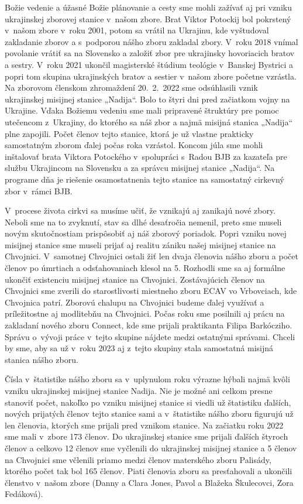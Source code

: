 Božie vedenie a úžasné Božie plánovanie a cesty sme mohli zažívať aj pri vzniku ukrajinskej zborovej stanice v~našom zbore. Brat Viktor Potockij bol pokrstený v~našom zbore v~roku 2001, potom sa vrátil na Ukrajinu, kde vyštudoval zakladanie zborov a s~podporou nášho zboru zakladal zbory. V~roku 2018 vnímal povolanie vrátiť sa na Slovensko a založiť zbor pre ukrajinsky hovoriacich bratov a sestry. V~roku 2021 ukončil magisterské štúdium teológie v~Banskej Bystrici a popri tom skupina ukrajinských bratov a sestier v~našom zbore početne vzrástla. Na zborovom členskom zhromaždení 20.~2.~2022 sme odsúhlasili vznik ukrajinskej misijnej stanice „Nadija“. Bolo to štyri dni pred začiatkom vojny na Ukrajine. Vďaka Božiemu vedeniu sme mali pripravené štruktúry pre pomoc utečencom z~Ukrajiny, do ktorého sa náš zbor a najmä misijná stanica „Nadija“ plne zapojili. Počet členov tejto stanice, ktorá je už vlastne prakticky samostatným zborom ďalej počas roka vzrástol. Koncom júla sme mohli inštalovať brata Viktora Potockého v~spolupráci s~Radou BJB za kazateľa pre službu Ukrajincom na Slovensku a za správcu misijnej stanice „Nadija“. Na programe dňa je riešenie osamostatnenia tejto stanice na samostatný cirkevný zbor v~rámci BJB.

V~procese života cirkvi sa musíme učiť, že vznikajú aj zanikajú nové zbory. Neboli sme na to zvyknutí, stav sa dlhé desaťročia nemenil, preto sme museli novým skutočnostiam prispôsobiť aj náš zborový poriadok. Popri vzniku novej misijnej stanice sme museli prijať aj realitu zániku našej misijnej stanice na Chvojnici. V~samotnej Chvojnici ostali žiť len dvaja členovia nášho zboru a počet členov po úmrtiach a odsťahovaniach klesol na 5. Rozhodli sme sa aj formálne ukončiť existenciu misijnej stanice na Chvojnici. Zostávajúcich členov na Chvojnici sme zverili do starostlivosti miestneho zboru ECAV vo Vrbovciach, kde Chvojnica patrí. Zborovú chalupu na Chvojnici budeme ďalej využívať a príležitostne aj modlitebňu na Chvojnici.
Počas roku sme posilnili aj prácu na zakladaní nového zboru Connect, kde sme prijali praktikanta Filipa Barkócziho. Správu o~vývoji práce v~tejto skupine nájdete medzi ostatnými správami. Chceli by sme, aby sa už v~roku 2023 aj z~tejto skupiny stala samostatná misijná stanica nášho zboru.


Čísla v~štatistike nášho zboru sa v~uplynulom roku výrazne hýbali najmä kvôli vzniku ukrajinskej misijnej stanice Nadija. Nie je možné ani celkom presne stanoviť počet, nakoľko po vzniku misijnej stanice si viedli už štatistiku ďalších, nových prijatých členov tejto stanice sami a v~štatistike nášho zboru figurujú už len členovia, ktorých sme prijali pred vznikom stanice.
Na začiatku roku 2022 sme mali v~zbore 173 členov. Do ukrajinskej stanice sme prijali ďalších štyroch členov a celkovo 12 členov sme vyčlenili do ukrajinskej misijnej stanice a 5 členov na Chvojnici sme včlenili priamo medzi členov materského zboru Palisády, ktorého počet tak bol 165 členov. Piati členovia zboru sa presťahovali a ukončili členstvo v~našom zbore (Danny a Clara Jones, Pavol a Blažeka Škulecovci, Zora Fedáková).

